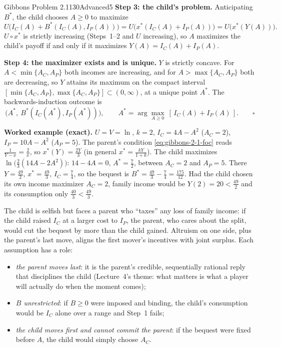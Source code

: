 \begin{exsol}{Gibbons Problem 2.1}{130}{Advanced}{5}
\textbf{Step 3: the child's problem.} Anticipating $B^*$, the child chooses $A \ge 0$ to maximize
\[
  U\bigl(I_C(A) + B^*(I_C(A), I_P(A))\bigr) = U\bigl(x^*(I_C(A) + I_P(A))\bigr) = U\bigl(x^*(Y(A))\bigr).
\]
$U \circ x^*$ is strictly increasing (Steps~1--2 and $U$ increasing), so $A$ maximizes the child's
payoff if and only if it maximizes $Y(A) = I_C(A) + I_P(A)$.

\textbf{Step 4: the maximizer exists and is unique.} $Y$ is strictly concave. For
$A < \min\{A_C, A_P\}$ both incomes are increasing, and for $A > \max\{A_C, A_P\}$ both are
decreasing, so $Y$ attains its maximum on the compact interval $[\min\{A_C,A_P\}, \max\{A_C,A_P\}]
\subset (0, \infty)$, at a unique point $A^*$. The backwards-induction outcome is
\[
  \bigl(A^*,\ B^*(I_C(A^*), I_P(A^*))\bigr), \qquad A^* = \arg\max_{A \ge 0}\ [\,I_C(A) + I_P(A)\,].
  \qquad\square
\]

\textbf{Worked example (exact).} $U = V = \ln$, $k = 2$, $I_C = 4A - A^2$ ($A_C = 2$),
$I_P = 10A - A^2$ ($A_P = 5$). The parent's condition \eqref{eq:gibbons-2-1-foc} reads
$\frac{1}{Y - x} = \frac{2}{x}$, so $x^*(Y) = \frac{2Y}{3}$ (in general $x^* = \frac{kY}{1+k}$).
The child maximizes $\ln\bigl(\frac23(14A - 2A^2)\bigr)$: $14 - 4A = 0$, $A^* = \frac72$, between
$A_C = 2$ and $A_P = 5$. There $Y = \frac{49}{2}$, $x^* = \frac{49}{3}$, $I_C = \frac74$, so the
bequest is $B^* = \frac{49}{3} - \frac74 = \frac{175}{12}$. Had the child chosen its own income
maximizer $A_C = 2$, family income would be $Y(2) = 20 < \frac{49}{2}$ and its consumption only
$\frac{40}{3} < \frac{49}{3}$.

\interp The child is selfish but faces a parent who ``taxes'' any loss of family income: if the
child raised $I_C$ at a larger cost to $I_P$, the parent, who cares about the split, would cut the
bequest by more than the child gained. Altruism on one side, plus the parent's last move, aligns
the first mover's incentives with joint surplus. Each assumption has a role:
\begin{itemize}
  \item \emph{the parent moves last}: it is the parent's credible, sequentially rational reply that
  disciplines the child (Lecture~4's theme: what matters is what a player will actually do when the
  moment comes);
  \item \emph{$B$ unrestricted}: if $B \ge 0$ were imposed and binding, the child's consumption would
  be $I_C$ alone over a range and Step~1 fails;
  \item \emph{the child moves first and cannot commit the parent}: if the bequest were fixed before
  $A$, the child would simply choose $A_C$.
\end{itemize}


\end{exsol}
